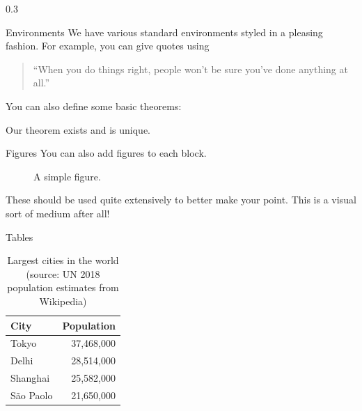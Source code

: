 \documentclass[final]{beamer}
\begin{document}
\begin{frame}[fragile]
\begin{columns}[t]
\separatorcolumn

\begin{column}{0.3\paperwidth}
\begin{block}{Environments}
    We have various standard environments styled in a pleasing fashion. For example,
    you can give quotes using

    \begin{quote}
    ``When you do things right, people won't be sure you've done anything at all.''
    \end{quote}

    You can also define some basic theorems:

    \begin{theorem}
    Our theorem exists and is unique.
    \end{theorem}
\end{block}

\begin{block}{Figures}
    You can also add figures to each block.

    \begin{figure}
    \caption{A simple figure.}
    \end{figure}

    These should be used quite extensively to better make your point. This is
    a visual sort of medium after all!
\end{block}

\begin{block}{Tables}
    \begin{table}
    \centering
    \caption{Largest cities in the world (source: UN 2018 population estimates
    from Wikipedia)}
    \begin{tabular}{@{} lr @{}}
        \toprule
        City & Population\\
        \midrule
        Tokyo & 37,468,000 \\
        Delhi & 28,514,000 \\
        Shanghai & 25,582,000 \\
        São Paolo & 21,650,000 \\
        \bottomrule
    \end{tabular}
    \end{table}


\end{block}
\end{column}
\end{columns}
\end{frame}
\end{document}
